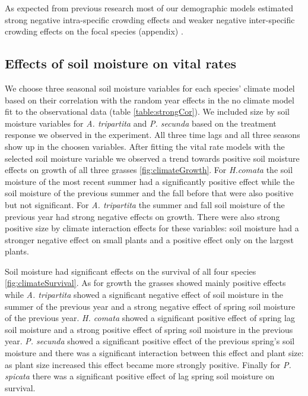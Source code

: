 \documentclass[11pt]{article}
\begin{document}
\begin{doublespacing}
As expected from previous research most of our demographic models estimated strong negative intra-specific crowding effects and weaker negative inter-specific crowding effects on the focal species (appendix) \citep{adler_coexistence_2010,chu_direct_2016,chu_large_2015}.

\subsection*{Effects of soil moisture on vital rates}

We choose three seasonal soil moisture variables for each species' climate model based on their correlation with the random year effects in the no climate model fit to the observational data (table \ref{table:strongCor}). We included size by soil moisture variables for \textit{A. tripartita} and  \textit{P. secunda} based on the treatment response we observed in the experiment. All three time lags and all three seasons show up in the choosen variables. After fitting the vital rate models with the selected soil moisture variable we observed a trend towards positive soil moisture effects on growth of all three grasses \ref{fig:climateGrowth}. For \textit{H.comata} the soil moisture of the most recent summer had a significantly positive effect while the soil moisture of the previous summer and the fall before that were also positive but not significant. For \textit{A. tripartita} the summer and fall soil moisture of the previous year had strong negative effects on growth.  There were also strong positive size by climate interaction effects for these variables: soil moisture had a stronger negative effect on small plants and a positive effect only on the largest plants.

Soil moisture had significant effects on the survival of all four species \ref{fig:climateSurvival}. As for growth the grasses showed mainly positive effects while \textit{A. tripartita} showed a significant negative effect of soil moisture in the summer of the previous year and a strong negative effect of spring soil moisture of the previous year. \textit{H. comata} showed a significant positive effect of spring lag soil moisture and a strong positive effect of spring soil moisture in the previous year. \textit{P. secunda} showed a significant positive effect of the previous spring's soil moisture and there was a significant interaction between this effect and plant size: as plant size increased this effect became more strongly positive. Finally for \textit{P. spicata} there was a significant positive effect of lag spring soil moisture on survival.


\end{doublespacing}
\end{document}
